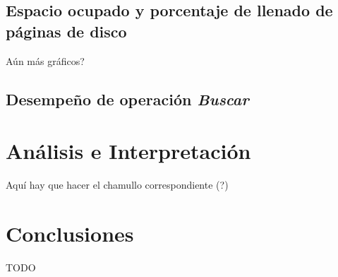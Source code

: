 \documentclass[letterpaper,10pt]{article}
\begin{document}
	\subsection{Espacio ocupado y porcentaje de llenado de páginas de disco}
	Aún más gráficos?

	\subsection{Desempeño de operación \textit{Buscar}}

	\newpage

	\section{Análisis e Interpretación}
	Aquí hay que hacer el chamullo correspondiente (?)

	\newpage

	\section{Conclusiones}

	TODO
\end{document}

